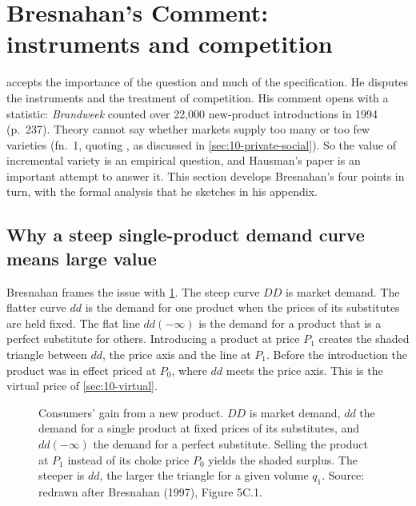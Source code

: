 \section{Bresnahan's Comment: instruments and competition}\label{sec:10-bresnahan}

\citet{Bresnahan1997} accepts the importance of the question and much of the specification. He disputes
the instruments and the treatment of competition. His comment opens with a statistic: \emph{Brandweek}
counted over 22,000 new-product introductions in 1994 (p.~237). Theory cannot say whether markets supply too
many or too few varieties (fn.~1, quoting \citealp{EatonLipsey1989}, as discussed in \cref{sec:10-private-social}).
So the value of incremental variety is an empirical question, and Hausman's paper is an important attempt to
answer it. This section develops Bresnahan's four points in turn, with the formal
analysis that he sketches in his appendix.

\subsection{Why a steep single-product demand curve means large value}\label{sec:10-bresnahan-dd}

Bresnahan frames the issue with \cref{fig:10-dd-DD}. The steep curve $DD$ is market demand. The flatter
curve $dd$ is the demand for one product when the prices of its substitutes are held fixed. The flat line
$dd(-\infty)$ is the demand for a product that is a perfect substitute for others. Introducing a product at
price $P_1$ creates the shaded triangle between $dd$, the price axis and the line at $P_1$. Before the
introduction the product was in effect priced at $P_0$, where $dd$ meets the price axis. This is the virtual
price of \cref{sec:10-virtual}.

\begin{figure}[htbp]
\centering
{}
\caption{Consumers' gain from a new product. $DD$ is market demand, $dd$ the demand for a single product at
fixed prices of its substitutes, and $dd(-\infty)$ the demand for a perfect substitute. Selling the product
at $P_1$ instead of its choke price $P_0$ yields the shaded surplus. The steeper is $dd$, the larger the
triangle for a given volume $q_1$. Source: redrawn after Bresnahan (1997), Figure 5C.1.}
\label{fig:10-dd-DD}
\end{figure}

